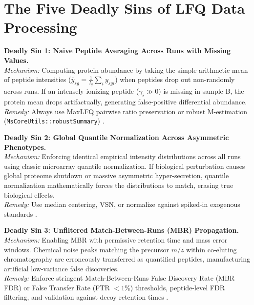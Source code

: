 \documentclass[11pt,oneside]{book}
\begin{document}
\clearpage
\section{The Five Deadly Sins of LFQ Data Processing}

\begin{pitfallbox}[top=4pt, bottom=4pt, before skip=3pt, after skip=3pt]
\textbf{Deadly Sin 1: Naive Peptide Averaging Across Runs with Missing Values.}\\
\textit{Mechanism:} Computing protein abundance by taking the simple arithmetic mean of peptide intensities ($\bar{y}_{sg} = \frac{1}{I_g} \sum_i y_{sgi}$) when peptides drop out non-randomly across runs. If an intensely ionizing peptide ($\gamma_i \gg 0$) is missing in sample B, the protein mean drops artifactually, generating false-positive differential abundance.\\
\textit{Remedy:} Always use MaxLFQ pairwise ratio preservation or robust M-estimation (\texttt{MsCoreUtils::robustSummary}) \cite{cox2014maxlfq, gatto2023qfeatures}.
\end{pitfallbox}

\begin{pitfallbox}[top=4pt, bottom=4pt, before skip=3pt, after skip=3pt]
\textbf{Deadly Sin 2: Global Quantile Normalization Across Asymmetric Phenotypes.}\\
\textit{Mechanism:} Enforcing identical empirical intensity distributions across all runs using classic microarray quantile normalization. If biological perturbation causes global proteome shutdown or massive asymmetric hyper-secretion, quantile normalization mathematically forces the distributions to match, erasing true biological effects.\\
\textit{Remedy:} Use median centering, VSN, or normalize against spiked-in exogenous standards \cite{callister2006normalization, bolstad2003comparison}.
\end{pitfallbox}

\begin{pitfallbox}[top=4pt, bottom=4pt, before skip=3pt, after skip=3pt]
\textbf{Deadly Sin 3: Unfiltered Match-Between-Runs (MBR) Propagation.}\\
\textit{Mechanism:} Enabling MBR with permissive retention time and mass error windows. Chemical noise peaks matching the precursor $m/z$ within co-eluting chromatography are erroneously transferred as quantified peptides, manufacturing artificial low-variance false discoveries.\\
\textit{Remedy:} Enforce stringent Match-Between-Runs False Discovery Rate (MBR FDR) or False Transfer Rate (FTR $< 1\%$) thresholds, peptide-level FDR filtering, and validation against decoy retention times \cite{cox2014maxlfq, demichev2020dia}.
\end{pitfallbox}
\end{document}
